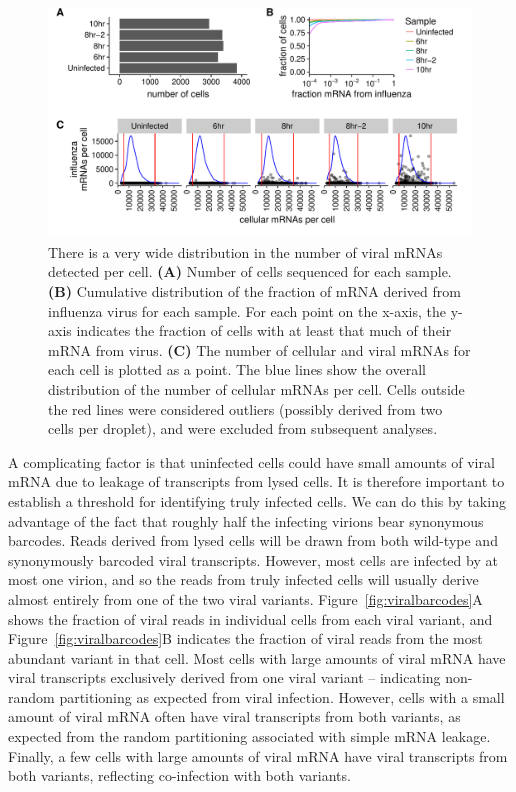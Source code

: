 \documentclass[9pt,lineno]{elife}
\begin{document}
\begin{figure}
\centerline{\includegraphics[width=0.9\linewidth]{figures/p_cell_mRNA_summary.pdf}}
\caption{\label{fig:cells}
There is a very wide distribution in the number of viral mRNAs detected per cell.
{\bf (A)} 
Number of cells sequenced for each sample.
{\bf (B)} 
Cumulative distribution of the fraction of mRNA derived from influenza virus for each sample.
For each point on the x-axis, the y-axis indicates the fraction of cells with at least that much of their mRNA from virus.
{\bf (C)} 
The number of cellular and viral mRNAs for each cell is plotted as a point.
The blue lines show the overall distribution of the number of cellular mRNAs per cell.
Cells outside the red lines were considered outliers (possibly derived from two cells per droplet), and were excluded from subsequent analyses.
}
\end{figure}

A complicating factor is that uninfected cells could have small amounts of viral mRNA due to leakage of transcripts from lysed cells.
It is therefore important to establish a threshold for identifying truly infected cells.
We can do this by taking advantage of the fact that roughly half the infecting virions bear synonymous barcodes.
Reads derived from lysed cells will be drawn from both wild-type and synonymously barcoded viral transcripts.
However, most cells are infected by at most one virion, and so the reads from truly infected cells will usually derive almost entirely from one of the two viral variants. 
Figure~\ref{fig:viralbarcodes}A shows the fraction of viral reads in individual cells from each viral variant, and Figure~\ref{fig:viralbarcodes}B indicates the fraction of viral reads from the most abundant variant in that cell.
Most cells with large amounts of viral mRNA have viral transcripts exclusively derived from one viral variant -- indicating non-random partitioning as expected from viral infection.
However, cells with a small amount of viral mRNA often have viral transcripts from both variants, as expected from the random partitioning associated with simple mRNA leakage.
Finally, a few cells with large amounts of viral mRNA have viral transcripts from both variants, reflecting co-infection with both variants.
\end{document}
